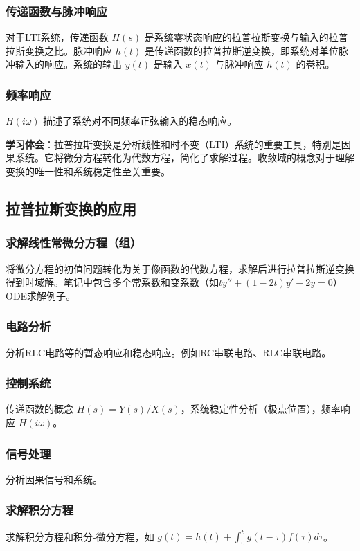 \documentclass[UTF8]{ctexart}
\begin{document}
	\subsubsection{传递函数与脉冲响应}
	对于LTI系统，传递函数 $H(s)$ 是系统零状态响应的拉普拉斯变换与输入的拉普拉斯变换之比。脉冲响应 $h(t)$ 是传递函数的拉普拉斯逆变换，即系统对单位脉冲输入的响应。系统的输出 $y(t)$ 是输入 $x(t)$ 与脉冲响应 $h(t)$ 的卷积。
	
	\subsubsection{频率响应}
	$H(i\omega)$ 描述了系统对不同频率正弦输入的稳态响应。
	
	\textbf{学习体会}：拉普拉斯变换是分析线性和时不变（LTI）系统的重要工具，特别是因果系统。它将微分方程转化为代数方程，简化了求解过程。收敛域的概念对于理解变换的唯一性和系统稳定性至关重要。
	
	\subsection{拉普拉斯变换的应用}
	\subsubsection{求解线性常微分方程（组）}
	将微分方程的初值问题转化为关于像函数的代数方程，求解后进行拉普拉斯逆变换得到时域解。笔记中包含多个常系数和变系数（如$ty''+(1-2t)y'-2y=0$）ODE求解例子。
	
	\subsubsection{电路分析}
	分析RLC电路等的暂态响应和稳态响应。例如RC串联电路、RLC串联电路。
	
	\subsubsection{控制系统}
	传递函数的概念 $H(s) = Y(s)/X(s)$，系统稳定性分析（极点位置），频率响应 $H(i\omega)$。
	
	\subsubsection{信号处理}
	分析因果信号和系统。
	
	\subsubsection{求解积分方程}
	求解积分方程和积分-微分方程，如 $g(t) = h(t) + \int_0^t g(t-\tau)f(\tau)d\tau$。
	
\end{document}
